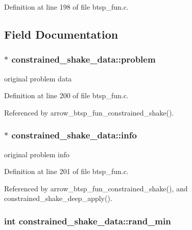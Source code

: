 Definition at line 198 of file btsp\_\-fun.c.

\subsection{Field Documentation}
\hypertarget{structconstrained__shake__data_ae6de8c84cb5dc65aae992effa7c2763}{
\subsubsection{$\ast$ {\bf constrained\_\-shake\_\-data::problem}}}
\label{structconstrained__shake__data_ae6de8c84cb5dc65aae992effa7c2763}


original problem data 

Definition at line 200 of file btsp\_\-fun.c.

Referenced by arrow\_\-btsp\_\-fun\_\-constrained\_\-shake().\hypertarget{structconstrained__shake__data_d9b2d3116046f50437d023ac9bfcd51f}{
\subsubsection{$\ast$ {\bf constrained\_\-shake\_\-data::info}}}
\label{structconstrained__shake__data_d9b2d3116046f50437d023ac9bfcd51f}


original problem info 

Definition at line 201 of file btsp\_\-fun.c.

Referenced by arrow\_\-btsp\_\-fun\_\-constrained\_\-shake(), and constrained\_\-shake\_\-deep\_\-apply().\hypertarget{structconstrained__shake__data_76a13ad58e4ad8c74270ce8b05765ff9}{
\subsubsection{\setlength{\rightskip}{0pt plus 5cm}int {\bf constrained\_\-shake\_\-data::rand\_\-min}}}
\label{structconstrained__shake__data_76a13ad58e4ad8c74270ce8b05765ff9}


